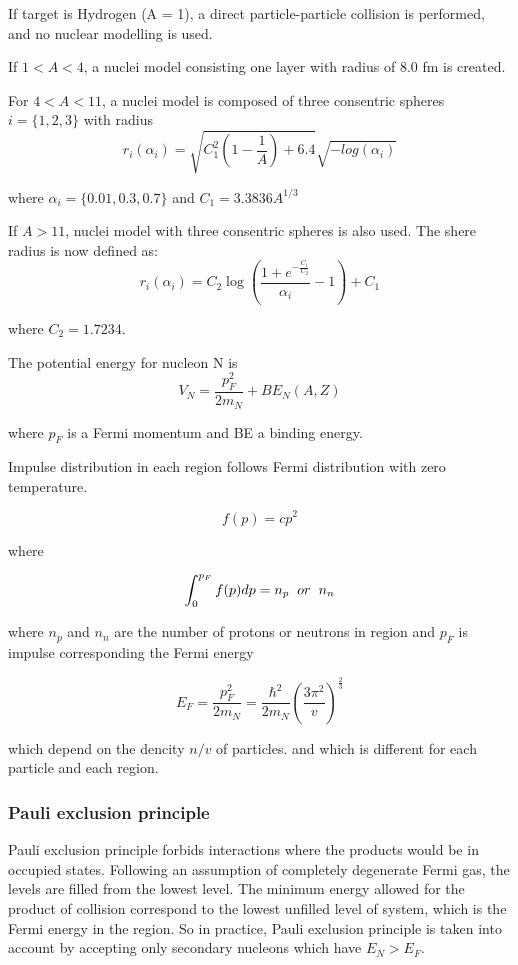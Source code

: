 \documentclass[twocolumn,twoside,slac]{revtex4}
\begin{document}
If target is Hydrogen (A = 1), a direct particle-particle collision is performed, 
and no nuclear modelling is used. 


If $1 < A < 4$, a nuclei model consisting one layer with radius of 8.0 fm is created.


For $4 < A < 11$, a nuclei model is composed of three consentric spheres $i = \{1, 2, 3\}$ with radius
$$r_{i}(\alpha_{i}) = \sqrt{C_{1}^{2} (1 - \frac{1}{A}) + 6.4} \sqrt{-log( \alpha_{i})}$$

where $\alpha_{i} = \{0.01, 0.3, 0.7\}$ and $C_{1} = 3.3836 A^{1/3}$

If $A > 11$, nuclei model with three consentric spheres is also used. The shere radius is now defined as:
$$r_{i}(\alpha_{i}) =  C_{2} \log({\frac{1 + e^{- \frac{C_{1}}{C_{2}}}}{\alpha_{i}} - 1}) + C_{1}$$

where $C_{2} = 1.7234$.

The potential energy for nucleon N is
$$ V_{N} = \frac{p_{F}^2}{2 m_{N}} + BE_{N}(A, Z)$$

where $p_F$ is a Fermi momentum and BE a binding energy. 
 
Impulse distribution in each region follows Fermi distribution with zero temperature.

\begin{equation}
 f(p) = c p ^2
 \end{equation}

 where

 \begin{equation}
 \int_0^{p_F} f(p) dp = n_{p} \hspace{0.2truecm}  or \hspace{0.2truecm}   n_{n}
 \end{equation}

 where $n_p$ and $n_n$ are the number of protons or neutrons in region and 
$p_F$ is impulse corresponding the Fermi energy

 \begin{equation}
 E_F = \frac{p_F^2}{2 m_N} = \frac{\hbar^2}{2 m_N}(\frac{3 \pi^{2}}{v})^\frac{2}{3}
 \end{equation}
 
 which depend on the dencity $n/v$ of particles. 
 and which is different for each particle and each region. 

\subsubsection{Pauli exclusion principle}
Pauli exclusion principle forbids interactions where the products would be in occupied states.
Following an assumption of completely degenerate Fermi gas, the levels are filled from the lowest level.
The minimum energy allowed for the product of collision correspond to the lowest unfilled level of system, which is the Fermi energy in the region. 
So in practice, Pauli exclusion principle is taken into account by accepting only secondary nucleons which have $E_N > E_F$.
\end{document}
